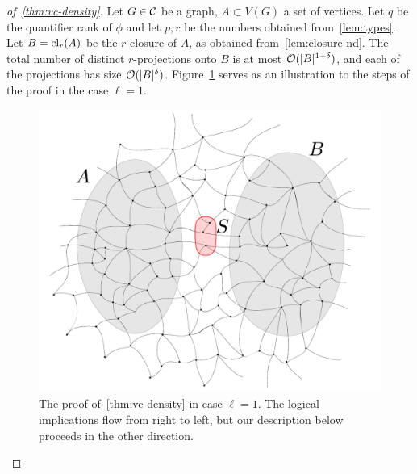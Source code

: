 \begin{proof}[of~\cref{thm:vc-density}]
%
%
%
%
Let $G\in\cal C$ be a graph, $A\subset V(G)$ a set of vertices.
	Let $q$ be the quantifier rank of $\phi$ and let 
$p,r$ be the numbers obtained from~\cref{lem:types}.
Let $B=\cl_r(A)$ be the $r$-closure of $A$, as obtained from~\cref{lem:closure-nd}.
  The total number of distinct $r$-projections onto $B$ 
  is at most $\Oof(|B|^{1+\delta})$, and each of the projections has size $\Oof(|B|^{\delta})$.
  	   Figure~\ref{fig:sketch} serves as  an illustration to the steps of the proof in the case $\ell=1$.
  	   \begin{figure}[h!]
  	   	\centering
  	   		\includegraphics[scale=0.346,page=4]{pics}
  			\caption{The proof of~\cref{thm:vc-density} in case $\ell=1$. 
  The logical implications flow from right to left,
  but our description below proceeds in the other direction.
  			}
  	   	\label{fig:sketch}
  	   \end{figure}
  

\end{proof}

